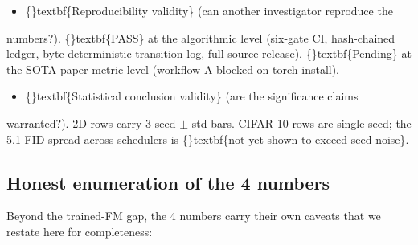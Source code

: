 \documentclass{article}
\begin{document}
\begin{itemize}
\item \{\}textbf\{Reproducibility validity\} (can another investigator reproduce the
\end{itemize}
numbers?). \{\}textbf\{PASS\} at the algorithmic level (six-gate CI, hash-chained ledger, byte-deterministic transition log, full source release). \{\}textbf\{Pending\} at the SOTA-paper-metric level (workflow A blocked on torch install).

\begin{itemize}
\item \{\}textbf\{Statistical conclusion validity\} (are the significance claims
\end{itemize}
warranted?). 2D rows carry 3-seed $\pm$ std bars. CIFAR-10 rows are single-seed; the 5.1-FID spread across schedulers is \{\}textbf\{not yet shown to exceed seed noise\}.

\subsection{Honest enumeration of the 4 numbers}
Beyond the trained-FM gap, the 4 numbers carry their own caveats that we restate here for completeness:
\end{document}
